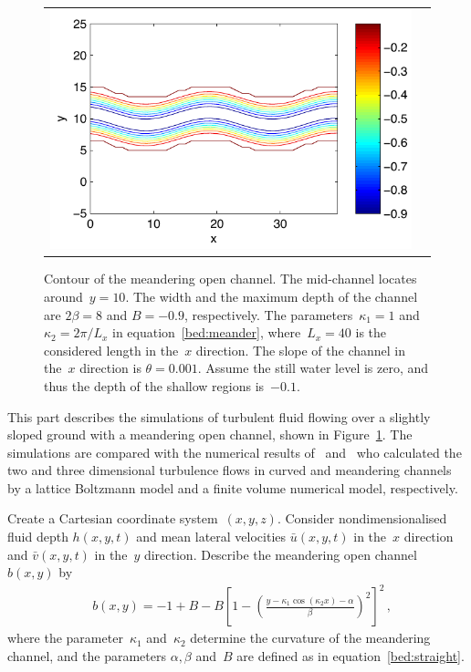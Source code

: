 \documentclass[12pt,a5paper]{article}
\newcommand{\uu}{{\bar u}}
\newcommand{\vv}{{\bar v}}
\begin{document}
\begin{figure}
\centering
\begin{tabular}{c@{}c}
\includegraphics[width=\textwidth]{meander-channel}
\end{tabular}
\caption{Contour of the meandering open channel. The mid-channel locates around~$y=10$. 
The width and the maximum depth of the channel are $2\beta=8$ and $B=-0.9$, respectively. The parameters~$\kappa_1=1$ and~$\kappa_2=2\pi/L_x$ in equation~\eqref{bed:meander}, where~$L_x=40$ is the considered length in the~$x$ direction. 
The slope of the channel in the~$x$ direction is $\theta=0.001$. 
Assume the still water level is zero, and thus the depth of the shallow regions is~$-0.1$.}
\label{meander-channel}
\end{figure}%

This part describes the simulations of turbulent fluid flowing over a slightly sloped ground with a meandering open channel, shown in Figure~\ref{meander-channel}. The simulations are compared with the numerical results of~\cite{Liu2009} and~\cite{Demuren1993} who calculated the two and three dimensional turbulence flows in curved and meandering channels by a lattice Boltzmann model and a finite volume numerical model, respectively.

Create a Cartesian coordinate system~$(x,y,z)$. 
Consider nondimensionalised fluid depth $h(x,y,t)$ and mean lateral velocities $\uu(x,y,t)$ in the~$x$ direction and $\vv(x,y,t)$ in the~$y$ direction. 
Describe the meandering open channel~$b(x,y)$ by
\begin{align}&
b(x,y)=-1+B-B\left[1-\left(\frac{y-\kappa_1\cos(\kappa_2x)-\alpha}{\beta}\right)^2\right]^2\,,\label{bed:meander}
\end{align}
where the parameter~$\kappa_1$ and~$\kappa_2$ determine the curvature of the meandering channel, and the parameters $\alpha, \beta$ and~$B$ are defined as in equation~\eqref{bed:straight}.
\end{document}
